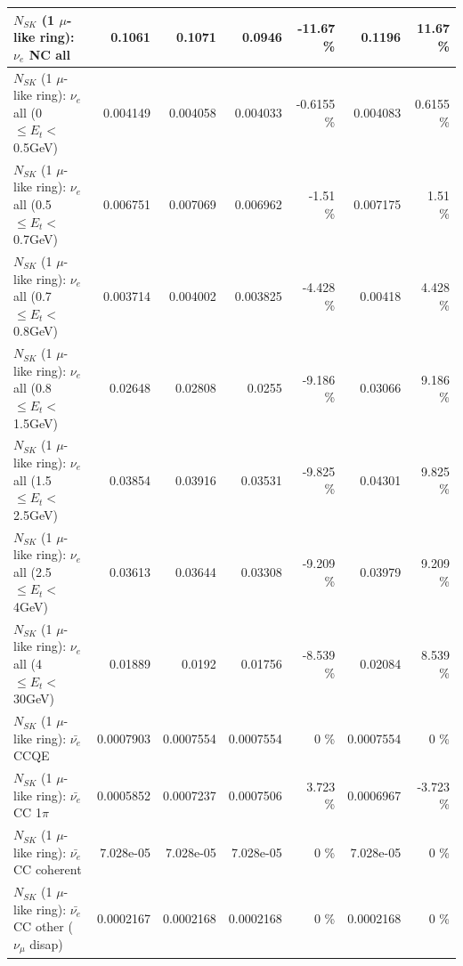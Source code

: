 \begin{table}
\begin{tabular}{| l | r | r | r  r | r  r |}
                                  $N_{SK}$ (1 $\mu$-like ring): $\nu_{e}$ NC all &          0.1061 &          0.1071 &          0.0946 &   -11.67 \%  &          0.1196 &    11.67 \%  \\ 
\hline
           $N_{SK}$ (1 $\mu$-like ring): $\nu_{e}$ all (0 $\leq E_{t} <$ 0.5GeV) &        0.004149 &        0.004058 &        0.004033 &  -0.6155 \%  &        0.004083 &   0.6155 \%  \\ 
         $N_{SK}$ (1 $\mu$-like ring): $\nu_{e}$ all (0.5 $\leq E_{t} <$ 0.7GeV) &        0.006751 &        0.007069 &        0.006962 &    -1.51 \%  &        0.007175 &     1.51 \%  \\ 
         $N_{SK}$ (1 $\mu$-like ring): $\nu_{e}$ all (0.7 $\leq E_{t} <$ 0.8GeV) &        0.003714 &        0.004002 &        0.003825 &   -4.428 \%  &         0.00418 &    4.428 \%  \\ 
         $N_{SK}$ (1 $\mu$-like ring): $\nu_{e}$ all (0.8 $\leq E_{t} <$ 1.5GeV) &         0.02648 &         0.02808 &          0.0255 &   -9.186 \%  &         0.03066 &    9.186 \%  \\ 
         $N_{SK}$ (1 $\mu$-like ring): $\nu_{e}$ all (1.5 $\leq E_{t} <$ 2.5GeV) &         0.03854 &         0.03916 &         0.03531 &   -9.825 \%  &         0.04301 &    9.825 \%  \\ 
           $N_{SK}$ (1 $\mu$-like ring): $\nu_{e}$ all (2.5 $\leq E_{t} <$ 4GeV) &         0.03613 &         0.03644 &         0.03308 &   -9.209 \%  &         0.03979 &    9.209 \%  \\ 
            $N_{SK}$ (1 $\mu$-like ring): $\nu_{e}$ all (4 $\leq E_{t} <$ 30GeV) &         0.01889 &          0.0192 &         0.01756 &   -8.539 \%  &         0.02084 &    8.539 \%  \\ 
\hline
\hline
\hline
                                $N_{SK}$ (1 $\mu$-like ring): $\bar{\nu_e}$ CCQE &       0.0007903 &       0.0007554 &       0.0007554 &        0 \%  &       0.0007554 &        0 \%  \\ 
                           $N_{SK}$ (1 $\mu$-like ring): $\bar{\nu_e}$ CC 1$\pi$ &       0.0005852 &       0.0007237 &       0.0007506 &    3.723 \%  &       0.0006967 &   -3.723 \%  \\ 
                         $N_{SK}$ (1 $\mu$-like ring): $\bar{\nu_e}$ CC coherent &       7.028e-05 &       7.028e-05 &       7.028e-05 &        0 \%  &       7.028e-05 &        0 \%  \\ 
          $N_{SK}$ (1 $\mu$-like ring): $\bar{\nu_e}$ CC other ($\nu_\mu$ disap) &       0.0002167 &       0.0002168 &       0.0002168 &        0 \%  &       0.0002168 &        0 \%  \\ 

\end{tabular}
\end{table}
